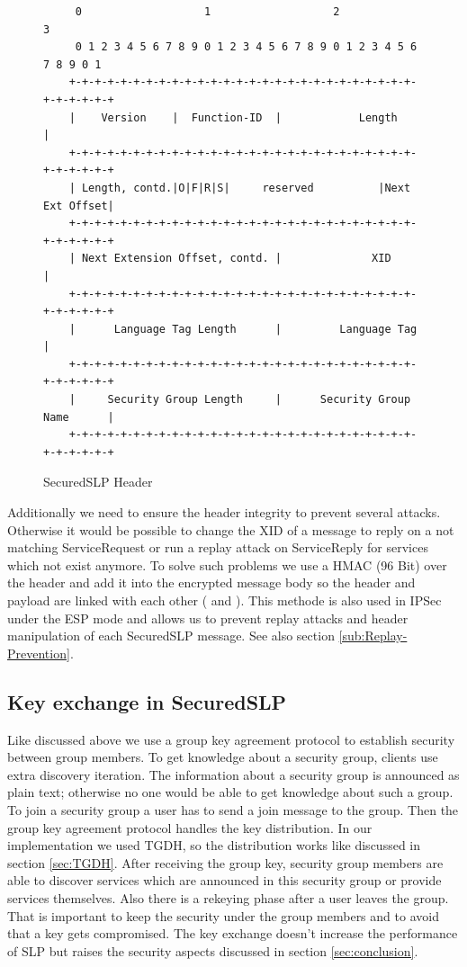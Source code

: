 \begin{figure}[!h]
\begin{lstlisting}
	 0                   1                   2                   3
	 0 1 2 3 4 5 6 7 8 9 0 1 2 3 4 5 6 7 8 9 0 1 2 3 4 5 6 7 8 9 0 1
	+-+-+-+-+-+-+-+-+-+-+-+-+-+-+-+-+-+-+-+-+-+-+-+-+-+-+-+-+-+-+-+-+
	|    Version    |  Function-ID  |            Length             |
	+-+-+-+-+-+-+-+-+-+-+-+-+-+-+-+-+-+-+-+-+-+-+-+-+-+-+-+-+-+-+-+-+
	| Length, contd.|O|F|R|S|     reserved          |Next Ext Offset|
	+-+-+-+-+-+-+-+-+-+-+-+-+-+-+-+-+-+-+-+-+-+-+-+-+-+-+-+-+-+-+-+-+
	| Next Extension Offset, contd. |              XID              |
	+-+-+-+-+-+-+-+-+-+-+-+-+-+-+-+-+-+-+-+-+-+-+-+-+-+-+-+-+-+-+-+-+
	|      Language Tag Length      |         Language Tag          |
	+-+-+-+-+-+-+-+-+-+-+-+-+-+-+-+-+-+-+-+-+-+-+-+-+-+-+-+-+-+-+-+-+
	|     Security Group Length     |      Security Group Name      |
	+-+-+-+-+-+-+-+-+-+-+-+-+-+-+-+-+-+-+-+-+-+-+-+-+-+-+-+-+-+-+-+-+
\end{lstlisting}
\label{fig:sslp-header}
\caption{SecuredSLP Header}
\end{figure}
Additionally we need to ensure the header integrity to prevent several attacks. Otherwise it would be possible to change the XID of a message to reply on a not matching ServiceRequest or run a replay attack on ServiceReply for services which not exist anymore. To solve such problems we use a HMAC (96 Bit) over the header and add it into the encrypted message body so the header and payload are linked with each other (\cite{Kraw97} and \cite{Kero00}). This methode is also used in IPSec under the ESP mode and allows us to prevent replay attacks and header manipulation of each SecuredSLP message. See also section \ref{sub:Replay-Prevention}.

\subsection{Key exchange in SecuredSLP}\label{sec:keyexchange}
Like discussed above we use a group key agreement protocol to establish security between group members. To get knowledge about a security group, clients use extra discovery iteration. The information about a security group is announced as plain text; otherwise no one would be able to get knowledge about such a group. To join a security group a user has to send a join message to the group. Then the group key agreement protocol handles the key distribution. In our implementation we used TGDH, so the distribution works like discussed in section \ref{sec:TGDH}. After receiving the group key, security group members are able to discover services which are announced in this security group or provide services themselves. Also there is a rekeying phase after a user leaves the group. That is important to keep the security under the group members and to avoid that a key gets compromised. The key exchange doesn't increase the performance of SLP but raises the security aspects discussed in section \ref{sec:conclusion}.

